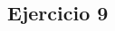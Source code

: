 \documentclass[10pt,a4paper, landscape]{article}
\begin{document}
\begin{multicols}{2}
		
		\vfill\null
		\columnbreak
		\subsection{Ejercicio 9}

\end{multicols}
\end{document}
